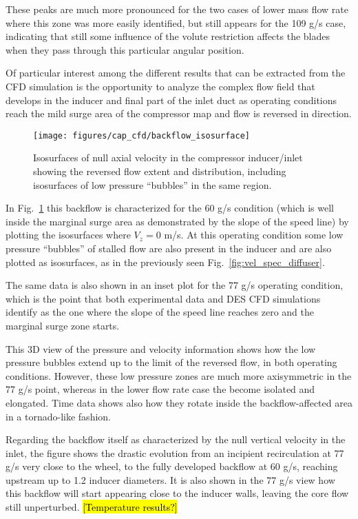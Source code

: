 These peaks are much more pronounced for the two cases of lower mass flow rate where this zone was more easily identified, but still appears for the 109 g/s case, indicating that still some influence of the volute restriction affects the blades when they pass through this particular angular position.

Of particular interest among the different results that can be extracted from the CFD simulation is the opportunity to analyze the complex flow field that develops in the inducer and final part of the inlet duct as operating conditions reach the mild surge area of the compressor map and flow is reversed in direction. 

\begin{figure}[htb!]
\centering
\texttt{[image: figures/cap\_cfd/backflow\_isosurface]}
\caption{Isosurfaces of null axial velocity in the compressor inducer/inlet showing the reversed flow extent and distribution, including isosurfaces of low pressure ``bubbles'' in the same region.}
\label{fig:cfd_backflow_isosurfaces}
\end{figure}

In Fig.~\ref{fig:cfd_backflow_isosurfaces} this backflow is characterized for the 60 g/s condition (which is well inside the marginal surge area as demonstrated by the slope of the speed line) by plotting the isosurfaces where $V_z = 0$ m/s. At this operating condition some low pressure ``bubbles'' of stalled flow are also present in the inducer and are also plotted as isosurfaces, as in the previously seen Fig.~\ref{fig:vel_spec_diffuser}. 

The same data is also shown in an inset plot for the 77 g/s operating condition, which is the point that both experimental data and DES CFD simulations identify as the one where the slope of the speed line reaches zero and the marginal surge zone starts.

This 3D view of the pressure and velocity information shows how the low pressure bubbles extend up to the limit of the reversed flow, in both operating conditions. However, these low pressure zones are much more axisymmetric in the 77 g/s point, whereas in the lower flow rate case the become isolated and elongated. Time data shows also how they rotate inside the backflow-affected area in a tornado-like fashion.

Regarding the backflow itself as characterized by the null vertical velocity in the inlet, the figure shows the drastic evolution from an incipient recirculation at 77 g/s very close to the wheel, to the fully developed backflow at 60 g/s, reaching upstream up to 1.2 inducer diameters. It is also shown in the 77 g/s view how this backflow will start appearing close to the inducer walls, leaving  the core flow still unperturbed. \hl{[Temperature results?]}

